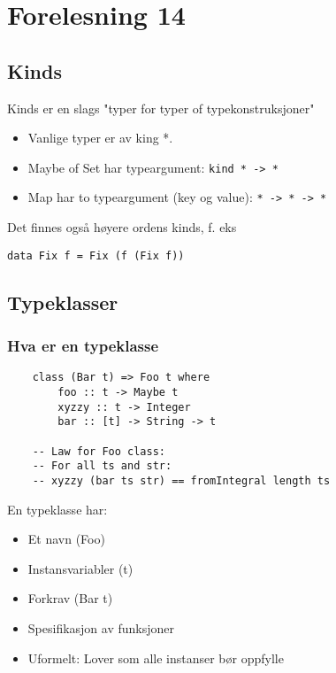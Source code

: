 \documentclass{article}
\begin{document}
    \section{Forelesning 14}

    \subsection{Kinds}
    Kinds er en slags "typer for typer of typekonstruksjoner"

    \begin{itemize}
        \item Vanlige typer er av king *.
        \item Maybe of Set har typeargument: \texttt{kind * -> *}
        \item Map har to typeargument (key og value): \texttt{* -> * -> *}
    \end{itemize}

    Det finnes også høyere ordens kinds, f. eks

    \begin{center}
        \texttt{data Fix f = Fix (f (Fix f))}
    \end{center}

    \subsection{Typeklasser}
    \subsubsection{Hva er en typeklasse}    

    \begin{lstlisting}
    class (Bar t) => Foo t where
        foo :: t -> Maybe t
        xyzzy :: t -> Integer
        bar :: [t] -> String -> t

    -- Law for Foo class:
    -- For all ts and str:
    -- xyzzy (bar ts str) == fromIntegral length ts
    \end{lstlisting}

    En typeklasse har:
    \begin{itemize}
        \item Et navn (Foo) 
        \item Instansvariabler (t)
        \item Forkrav (Bar t)
        \item Spesifikasjon av funksjoner
        \item Uformelt: Lover som alle instanser bør oppfylle
    \end{itemize}
\end{document}
